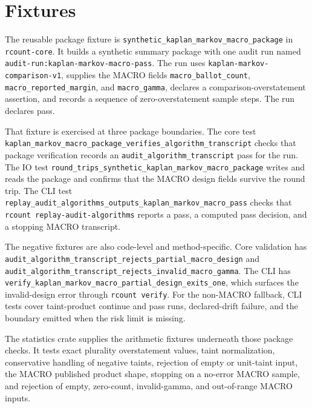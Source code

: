 \section{Fixtures}

The reusable package fixture is
\texttt{synthetic\_kaplan\_markov\_macro\_package} in \texttt{rcount-core}. It
builds a synthetic summary package with one audit run named
\texttt{audit-run:kaplan-markov-macro-pass}. The run uses
\texttt{kaplan-markov-comparison-v1}, supplies the MACRO fields
\texttt{macro\_ballot\_count}, \texttt{macro\_reported\_margin}, and
\texttt{macro\_gamma}, declares a comparison-overstatement assertion, and records
a sequence of zero-overstatement sample steps. The run declares pass.

That fixture is exercised at three package boundaries. The core test
\texttt{kaplan\_markov\_macro\_package\_verifies\_algorithm\_transcript} checks
that package verification records an \texttt{audit\_algorithm\_transcript} pass
for the run. The IO test
\texttt{round\_trips\_synthetic\_kaplan\_markov\_macro\_package} writes and reads
the package and confirms that the MACRO design fields survive the round trip.
The CLI test \texttt{replay\_audit\_algorithms\_outputs\_kaplan\_markov\_macro\_pass}
checks that \texttt{rcount replay-audit-algorithms} reports a pass, a computed
pass decision, and a stopping MACRO transcript.

The negative fixtures are also code-level and method-specific. Core validation
has \texttt{audit\_algorithm\_transcript\_rejects\_partial\_macro\_design} and
\texttt{audit\_algorithm\_transcript\_rejects\_invalid\_macro\_gamma}. The CLI
has \texttt{verify\_kaplan\_markov\_macro\_partial\_design\_exits\_one}, which
surfaces the invalid-design error through \texttt{rcount verify}. For the
non-MACRO fallback, CLI tests cover taint-product continue and pass runs,
declared-drift failure, and the boundary emitted when the risk limit is missing.

The statistics crate supplies the arithmetic fixtures underneath those package
checks. It tests exact plurality overstatement values, taint normalization,
conservative handling of negative taints, rejection of empty or unit-taint input,
the MACRO published product shape, stopping on a no-error MACRO sample, and
rejection of empty, zero-count, invalid-gamma, and out-of-range MACRO inputs.
